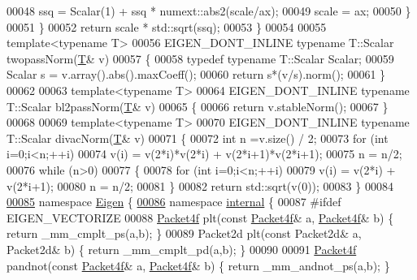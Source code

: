 \begin{DoxyCode}
00048       ssq = Scalar(1) + ssq * numext::abs2(scale/ax);
00049       scale = ax;
00050     \}
00051   \}
00052   \textcolor{keywordflow}{return} scale * std::sqrt(ssq);
00053 \}
00054 
00055 \textcolor{keyword}{template}<\textcolor{keyword}{typename} T>
00056 EIGEN\_DONT\_INLINE \textcolor{keyword}{typename} T::Scalar twopassNorm(\hyperlink{group___sparse_core___module}{T}& v)
00057 \{
00058   \textcolor{keyword}{typedef} \textcolor{keyword}{typename} T::Scalar Scalar;
00059   Scalar s = v.array().abs().maxCoeff();
00060   \textcolor{keywordflow}{return} s*(v/s).norm();
00061 \}
00062 
00063 \textcolor{keyword}{template}<\textcolor{keyword}{typename} T>
00064 EIGEN\_DONT\_INLINE \textcolor{keyword}{typename} T::Scalar bl2passNorm(\hyperlink{group___sparse_core___module}{T}& v)
00065 \{
00066   \textcolor{keywordflow}{return} v.stableNorm();
00067 \}
00068 
00069 \textcolor{keyword}{template}<\textcolor{keyword}{typename} T>
00070 EIGEN\_DONT\_INLINE \textcolor{keyword}{typename} T::Scalar divacNorm(\hyperlink{group___sparse_core___module}{T}& v)
00071 \{
00072   \textcolor{keywordtype}{int} n =v.size() / 2;
00073   \textcolor{keywordflow}{for} (\textcolor{keywordtype}{int} i=0;i<n;++i)
00074     v(i) = v(2*i)*v(2*i) + v(2*i+1)*v(2*i+1);
00075   n = n/2;
00076   \textcolor{keywordflow}{while} (n>0)
00077   \{
00078     \textcolor{keywordflow}{for} (\textcolor{keywordtype}{int} i=0;i<n;++i)
00079       v(i) = v(2*i) + v(2*i+1);
00080     n = n/2;
00081   \}
00082   \textcolor{keywordflow}{return} std::sqrt(v(0));
00083 \}
00084 
\hyperlink{namespace_eigen}{00085} \textcolor{keyword}{namespace }\hyperlink{namespace_eigen}{Eigen} \{
\hyperlink{namespace_eigen_1_1internal}{00086} \textcolor{keyword}{namespace }\hyperlink{namespaceinternal}{internal} \{
00087 \textcolor{preprocessor}{#ifdef EIGEN\_VECTORIZE}
00088 \hyperlink{struct_eigen_1_1internal_1_1_packet4f}{Packet4f} plt(\textcolor{keyword}{const} \hyperlink{struct_eigen_1_1internal_1_1_packet4f}{Packet4f}& a, \hyperlink{struct_eigen_1_1internal_1_1_packet4f}{Packet4f}& b) \{ \textcolor{keywordflow}{return} \_mm\_cmplt\_ps(a,b); \}
00089 Packet2d plt(\textcolor{keyword}{const} Packet2d& a, Packet2d& b) \{ \textcolor{keywordflow}{return} \_mm\_cmplt\_pd(a,b); \}
00090 
00091 \hyperlink{struct_eigen_1_1internal_1_1_packet4f}{Packet4f} pandnot(\textcolor{keyword}{const} \hyperlink{struct_eigen_1_1internal_1_1_packet4f}{Packet4f}& a, \hyperlink{struct_eigen_1_1internal_1_1_packet4f}{Packet4f}& b) \{ \textcolor{keywordflow}{return} \_mm\_andnot\_ps(a,b); \}

\end{DoxyCode}

